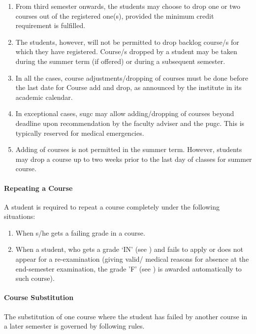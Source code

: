\begin{enumerate}[leftmargin=15mm, resume]
    \item From third semester onwards, the \glspl{student} may choose to drop one or two courses out of the registered one(s), provided the minimum credit requirement is fulfilled. 
    \item The \glspl{student}, however, will not be permitted to drop backlog course/s for which they have registered. Course/s dropped by a \gls{student} may be taken during the summer term (if offered) or during a subsequent semester. 
    \item In all the cases, course adjustments/dropping of courses must be done before the last date for Course add and drop, as announced by the \gls{institute} in its academic calendar. 
    \item In exceptional cases, \acrshort{sugc} may allow adding/dropping of courses beyond deadline upon recommendation by the faculty adviser and the \acrshort{pugc}. This is typically reserved for medical emergencies. 
    \item Adding of courses is not permitted in the summer term. However, \glspl{student} may drop a course up to two weeks prior to the last day of classes for summer course.
\end{enumerate}

\paragraph{Repeating a Course} A \gls{student} is required to repeat a course completely under the following situations: 

\begin{enumerate}[leftmargin=15mm, resume]
    \item When s/he gets a failing grade in a course. 
    \item When a \gls{student}, who gets a grade ‘IN' (see ) and fails to apply or does not appear for a re-examination (giving valid/ medical reasons for absence at the end-semester examination, the grade 'F' (see ) is awarded automatically to such course).
\end{enumerate}

\paragraph{Course Substitution} The substitution of one course where the \gls{student} has failed by another course in a later semester is governed by following rules.

